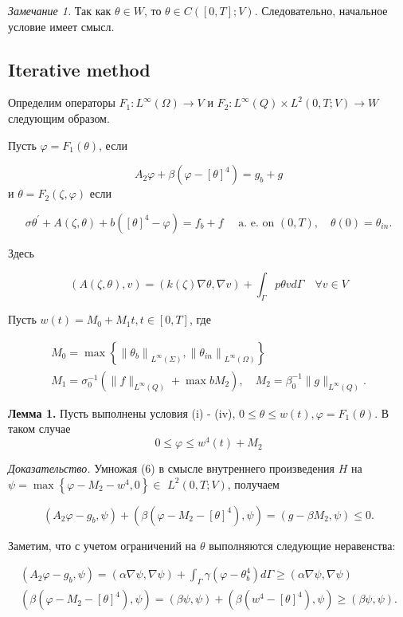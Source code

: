 \textit{Замечание 1.}
Так как $\theta \in W$, то $\theta \in C([0, T] ; V)$.
Следовательно, начальное условие имеет смысл.

\subsection{Iterative method}\label{subsec:ch3:sec1:subsec3}
Определим операторы
$F_{1}: L^{\infty}(\Omega) \rightarrow V$ и $F_{2}: L^{\infty}(Q) \times L^{2}(0, T ;V) \rightarrow W$
следующим образом.


Пусть $\varphi=F_{1}(\theta)$, если

$$
A_{2} \varphi+\beta\left(\varphi-[\theta]^{4}\right)=g_{b}+g
$$
и $\theta=F_{2}(\zeta, \varphi)$ если

$$
\sigma \theta^{\prime}+A(\zeta, \theta)+b\left([\theta]^{4}-\varphi\right)=f_{b}
+f \quad \text { a. e. on }(0, T), \quad \theta(0)=\theta_{i n}.
$$

Здесь

$$
(A(\zeta, \theta), v)=(k(\zeta) \nabla \theta, \nabla v)+\int_{\Gamma} p \theta v d \Gamma \quad \forall v \in V
$$

Пусть $w(t)=M_{0}+M_{1} t, t \in[0, T]$, где

$$
\begin{gathered}
    M_{0}=\max \left\{\left\|\theta_{b}\right\|_{L^{\infty}(\Sigma)},
    \left\|\theta_{i n}\right\|_{L^{\infty}(\Omega)}\right\} \\
    M_{1}=\sigma_{0}^{-1}\left(\|f\|_{L^{\infty}(Q)}+\max b M_{2}\right),
    \quad M_{2}=\beta_{0}^{-1}\|g\|_{L^{\infty}(Q)} .
\end{gathered}
$$


\textbf{Лемма 1.}
Пусть выполнены условия (i) - (iv), $0 \leq \theta \leq w(t), \varphi=F_{1}(\theta)$.
В таком случае
$$
0 \leq \varphi \leq w^{4}(t)+M_{2}
$$

\textit{Доказательство.}
Умножая (6) в смысле внутреннего произведения $H$ на
$\psi=\max \left\{\varphi-M_{2}-w^{4}, 0\right\} \in$ $L^{2}(0, T ; V)$, получаем

$$
\left(A_{2} \varphi-g_{b}, \psi\right)+\left(\beta\left(\varphi-M_{2}-[\theta]^{4}\right),
\psi\right)=\left(g-\beta M_{2}, \psi\right) \leq 0.
$$

Заметим, что с учетом ограничений на $\theta$ выполняются следующие неравенства:

$$
\begin{gathered}
    \left(A_{2} \varphi-g_{b}, \psi\right)=(\alpha \nabla \psi, \nabla \psi)+\int_{\Gamma} \gamma\left(\varphi-\theta_{b}^{4}\right) d \Gamma \geq(\alpha \nabla \psi, \nabla \psi) \\
    \left(\beta\left(\varphi-M_{2}-[\theta]^{4}\right), \psi\right)=(\beta \psi, \psi)+\left(\beta\left(w^{4}-[\theta]^{4}\right), \psi\right) \geq(\beta \psi, \psi) .
\end{gathered}
$$


